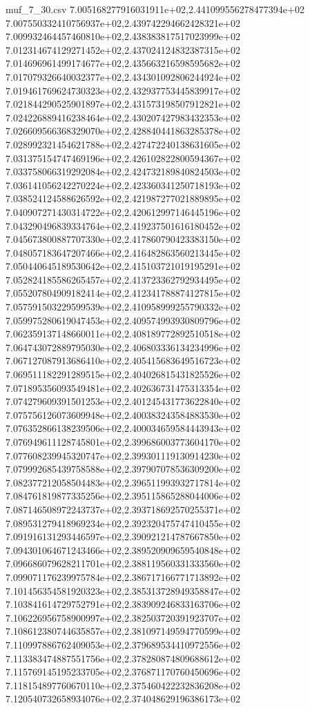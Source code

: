 \begin{filecontents*}{muf_7_30.csv}
7.005168277916031911e+02,2.441099556278477394e+02
7.007550332410756937e+02,2.439742294662428321e+02
7.009932464457460810e+02,2.438383817517023999e+02
7.012314674129271452e+02,2.437024124832387315e+02
7.014696961499174677e+02,2.435663216598595682e+02
7.017079326640032377e+02,2.434301092806244924e+02
7.019461769624730323e+02,2.432937753445839917e+02
7.021844290525901897e+02,2.431573198507912821e+02
7.024226889416238464e+02,2.430207427983432353e+02
7.026609566368329070e+02,2.428840441863285378e+02
7.028992321454621788e+02,2.427472240138631605e+02
7.031375154747469196e+02,2.426102822800594367e+02
7.033758066319292084e+02,2.424732189840824503e+02
7.036141056242270224e+02,2.423360341250718193e+02
7.038524124588626592e+02,2.421987277021889895e+02
7.040907271430314722e+02,2.420612997146445196e+02
7.043290496839334764e+02,2.419237501616180452e+02
7.045673800887707330e+02,2.417860790423383150e+02
7.048057183647207466e+02,2.416482863560213445e+02
7.050440645189530642e+02,2.415103721019195291e+02
7.052824185586265457e+02,2.413723362792934495e+02
7.055207804909182414e+02,2.412341788874127815e+02
7.057591503229599539e+02,2.410958999255790332e+02
7.059975280619047453e+02,2.409574993930809796e+02
7.062359137148660011e+02,2.408189772892510518e+02
7.064743072889795030e+02,2.406803336134234996e+02
7.067127087913686410e+02,2.405415683649516723e+02
7.069511182291289515e+02,2.404026815431825526e+02
7.071895356093549481e+02,2.402636731475313354e+02
7.074279609391501253e+02,2.401245431773622840e+02
7.075756126073609948e+02,2.400383243584883530e+02
7.076352866138239506e+02,2.400034659584443943e+02
7.076949611128745801e+02,2.399686003773604170e+02
7.077608239945320747e+02,2.399301119130914230e+02
7.079992685439758588e+02,2.397907078536309200e+02
7.082377212058504483e+02,2.396511993932717814e+02
7.084761819877335256e+02,2.395115865288044006e+02
7.087146508972243737e+02,2.393718692570255371e+02
7.089531279418969234e+02,2.392320475747410455e+02
7.091916131293446597e+02,2.390921214787667850e+02
7.094301064671243466e+02,2.389520909659540848e+02
7.096686079628211701e+02,2.388119560331333560e+02
7.099071176239975784e+02,2.386717166771713892e+02
7.101456354581920323e+02,2.385313728949358847e+02
7.103841614729752791e+02,2.383909246833163706e+02
7.106226956758900997e+02,2.382503720391923707e+02
7.108612380744635857e+02,2.381097149594770599e+02
7.110997886762409053e+02,2.379689534410972556e+02
7.113383474887551756e+02,2.378280874809688612e+02
7.115769145195233705e+02,2.376871170760450696e+02
7.118154897760670110e+02,2.375460422232836208e+02
7.120540732658934076e+02,2.374048629196386173e+02

\end{filecontents*}
